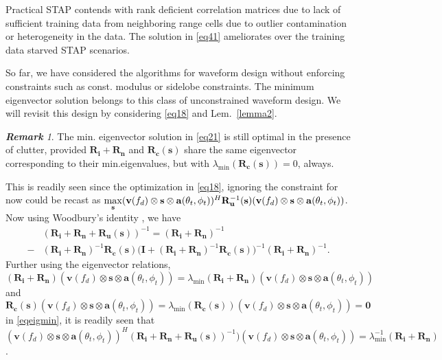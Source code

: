 \documentclass[11pt,draftclsnofoot,onecolumn]{IEEEtran}
\theoremstyle{definition}
\theoremstyle{remark}
\newtheorem{remk}{\bf Remark}
\begin{document}
Practical STAP contends with rank deficient correlation matrices due to lack of sufficient training data from neighboring range cells due to outlier contamination or heterogeneity in the data. The solution in \eqref{eq41} ameliorates over the training data starved STAP scenarios.

So far, we have considered the algorithms for waveform design without enforcing constraints such as const. modulus or sidelobe constraints. The minimum eigenvector solution belongs to this class of unconstrained waveform design. We will revisit this design by considering \eqref{eq18} and Lem.~\ref{lemma2}.
\begin{remk} \label{remark5}
The min. eigenvector solution in \eqref{eq21} is still optimal in the presence of clutter, provided $\mathbf{R_i}+\mathbf{R_n}$ and $\mathbf{R_c}(\mathbf{s})$ share the same eigenvector corresponding to their min.eigenvalues, but with $\lambda_{\min}(\mathbf{R_c}(\mathbf{s}))=0$, always.
\end{remk}

This is readily seen since the optimization in \eqref{eq18}, ignoring the constraint for now could be recast as $\max \limits_\mathbf{s} (\mathbf{v}(f_d)\otimes\mathbf{s}\otimes\mathbf{a}(\theta_t,\phi_t))^H\mathbf{R}_{\bf u}^{-1}(\mathbf{s})(\mathbf{v}(f_d)\otimes\mathbf{s}\otimes\mathbf{a}(\theta_t,\phi_t))$.  Now using Woodbury's identity \cite{Kayest1998}, we have
\begin{equation} \label{eqeigmin}
\begin{aligned}
&(\mathbf{R_i}+\mathbf{R_n}+\mathbf{R_u}(\mathbf{s}))^{-1}  =(\mathbf{R_i}+\mathbf{R_n})^{-1} \\
-&(\mathbf{R_i}+\mathbf{R_n})^{-1}\mathbf{R_c}(\mathbf{s} ) \bigl( \mathbf{I}+ (\mathbf{R_i}+\mathbf{R_n})^{-1} \mathbf{R_c}(\mathbf{s})\bigr) ^{-1}(\mathbf{R_i}+\mathbf{R_n})^{-1}.
\end{aligned}
\end{equation}
Further using the eigenvector relations, $(\mathbf{R_i}+\mathbf{R_n})(\mathbf{v}(f_d)\otimes\mathbf{s}\otimes\mathbf{a}(\theta_t,\phi_t))=\lambda_{\min}(\mathbf{R_i}+\mathbf{R_n})(\mathbf{v}(f_d)\otimes\mathbf{s}\otimes\mathbf{a}(\theta_t,\phi_t))$ and $\mathbf{R_c} (\mathbf{s}) (\mathbf{v}(f_d)\otimes\mathbf{s}\otimes\mathbf{a}(\theta_t,\phi_t))=\lambda_{\min}(\mathbf{R_c}( \mathbf{s}))(\mathbf{v}(f_d)\otimes\mathbf{s}\otimes\mathbf{a}(\theta_t,\phi_t))=\mathbf{0}$ in \eqref{eqeigmin}, it is readily seen that $(\mathbf{v}(f_d)\otimes\mathbf{s}\otimes\mathbf{a}(\theta_t,\phi_t))^H(\mathbf{R_i}+\mathbf{R_n}+\mathbf{R_u}(\mathbf{s}))^{-1} )(\mathbf{v}(f_d)\otimes\mathbf{s}\otimes\mathbf{a}(\theta_t,\phi_t))=\lambda_{\min}^{-1}( \mathbf{R_i}+\mathbf{R_n})$.
\end{document}
